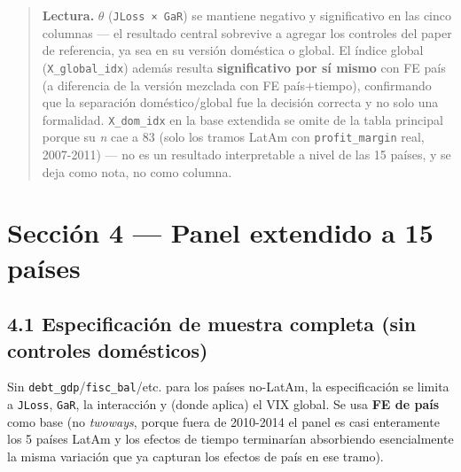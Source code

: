 \documentclass[
]{article}
\begin{document}
\begin{quote}
\textbf{Lectura.} \(\theta\) (\texttt{JLoss\ ×\ GaR}) se mantiene
negativo y significativo en las cinco columnas --- el resultado central
sobrevive a agregar los controles del paper de referencia, ya sea en su
versión doméstica o global. El índice global (\texttt{X\_global\_idx})
además resulta \textbf{significativo por sí mismo} con FE país (a
diferencia de la versión mezclada con FE país+tiempo), confirmando que
la separación doméstico/global fue la decisión correcta y no solo una
formalidad. \texttt{X\_dom\_idx} en la base extendida se omite de la
tabla principal porque su \emph{n} cae a 83 (solo los tramos LatAm con
\texttt{profit\_margin} real, 2007-2011) --- no es un resultado
interpretable a nivel de las 15 países, y se deja como nota, no como
columna.
\end{quote}

\section{Sección 4 --- Panel extendido a 15
países}\label{secciuxf3n-4-panel-extendido-a-15-pauxedses}

\subsection{4.1 Especificación de muestra completa (sin controles
domésticos)}\label{especificaciuxf3n-de-muestra-completa-sin-controles-domuxe9sticos}

Sin \texttt{debt\_gdp}/\texttt{fisc\_bal}/etc. para los países no-LatAm,
la especificación se limita a \texttt{JLoss}, \texttt{GaR}, la
interacción y (donde aplica) el VIX global. Se usa \textbf{FE de país}
como base (no \emph{twoways}, porque fuera de 2010-2014 el panel es casi
enteramente los 5 países LatAm y los efectos de tiempo terminarían
absorbiendo esencialmente la misma variación que ya capturan los efectos
de país en ese tramo).
\end{document}
